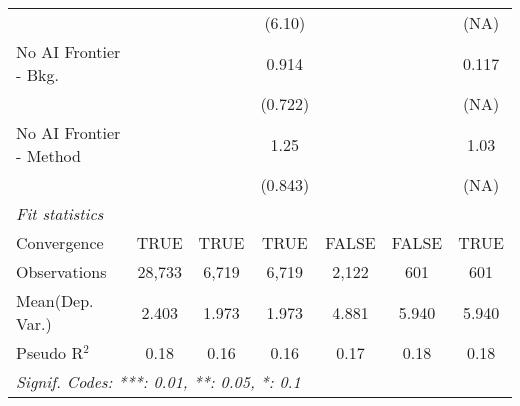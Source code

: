 \begin{tabular}{lcccccc}
                           &         &       & (6.10)        &        &        & (NA)\\   
   No AI Frontier - Bkg.   &         &       & 0.914         &        &        & 0.117\\   
                           &         &       & (0.722)       &        &        & (NA)\\   
   No AI Frontier - Method &         &       & 1.25          &        &        & 1.03\\   
                           &         &       & (0.843)       &        &        & (NA)\\   
   \midrule
   \emph{Fit statistics}\\
   Convergence             &TRUE     & TRUE  & TRUE          & FALSE  & FALSE  & TRUE\\  
   Observations            & 28,733  & 6,719 & 6,719         & 2,122  & 601    & 601\\  
Mean(Dep. Var.) & 2.403 & 1.973 & 1.973 & 4.881 & 5.940 & 5.940 \\
   Pseudo R$^2$            & 0.18    & 0.16  & 0.16          & 0.17   & 0.18   & 0.18\\  
   \midrule \midrule
   \multicolumn{7}{l}{\emph{Signif. Codes: ***: 0.01, **: 0.05, *: 0.1}}\\
\end{tabular}
\par\endgroup
